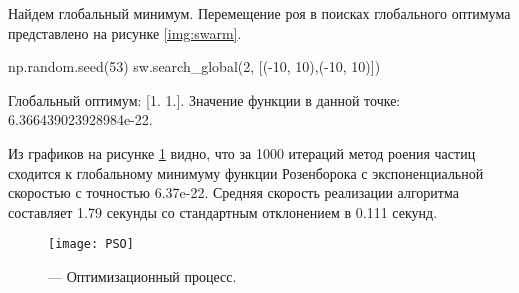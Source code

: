 Найдем глобальный минимум. Перемещение роя в поисках глобального оптимума представлено на рисунке \ref{img:swarm}.
\begin{pyin}
np.random.seed(53)
sw.search_global(2, [(-10, 10),(-10, 10)])
\end{pyin}

\begin{pyout}
Глобальный оптимум: [1. 1.].
Значение функции в данной точке: 6.366439023928984e-22.
\end{pyout}

Из графиков на рисунке \ref{img:PSO} видно, что за 1000 итераций метод роения частиц сходится к глобальному минимуму функции Розенборока с экспоненциальной скоростью с точностью 6.37e-22. Средняя скорость реализации алгоритма составляет 1.79 секунды со стандартным отклонением в 0.111 секунд.

\begin{figure}[h!]
\centering
\texttt{[image: PSO]}
\caption{ --- Оптимизационный процесс.}
\label{img:PSO}
\end{figure}
